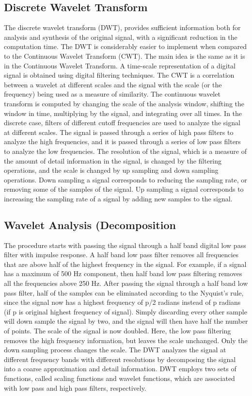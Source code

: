 \documentclass[a4paper,12pt]{article}
\begin{document}
\subsection{Discrete Wavelet Transform}
The discrete wavelet transform (DWT), provides sufficient information both for analysis and synthesis of the original signal, with a significant reduction in the computation time. The DWT is considerably easier to implement when compared to the Continuous Wavelet Transform (CWT). The main idea is the same as it is in the Continuous Wavelet Transform. A time-scale representation of a digital signal is obtained using digital filtering techniques. The CWT is a correlation between a wavelet at different scales and the signal with the scale (or the frequency) being used as a measure of similarity. The continuous wavelet transform is computed by changing the scale of the analysis window, shifting the window in time, multiplying by the signal, and integrating over all times. In the discrete case, filters of different cutoff frequencies are used to analyze the signal at different scales. The signal is passed through a series of high pass filters to analyze the high frequencies, and it is passed through a series of low pass filters to analyze the low frequencies. The resolution of the signal, which is a measure of the amount of detail information in the signal, is changed by the filtering operations, and the scale is changed by up sampling and down sampling operations. Down sampling a signal corresponds to reducing the sampling rate, or removing some of the samples of the signal. Up sampling a signal corresponds to increasing the sampling rate of a signal by adding new samples to the signal.


\subsection{Wavelet Analysis (Decomposition}
The procedure starts with passing the signal through a half band digital low pass filter with impulse response. A half band low pass filter removes all frequencies that are above half of the highest frequency in the signal. For example, if a signal has a maximum of 500 Hz component, then half band low pass filtering removes all the frequencies above 250 Hz. After passing the signal through a half band low pass filter, half of the samples can be eliminated according to the Nyquist’s rule, since the signal now has a highest frequency of p/2 radians instead of p radians (if p is original highest frequency of signal). Simply discarding every other sample will down sample the signal by two, and the signal will then have half the number of points. The scale of the signal is now doubled. Here, the low pass filtering removes the high frequency information, but leaves the scale unchanged. Only the down sampling process changes the scale. The DWT analyzes the signal at different frequency bands with different resolutions by decomposing the signal into a coarse approximation and detail information. DWT employs two sets of functions, called scaling functions and wavelet functions, which are associated with low pass and high pass filters, respectively. 
\end{document}
